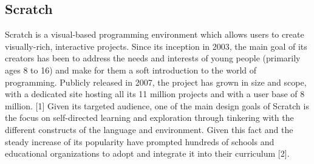 \subsection{Scratch}
Scratch is a visual-based programming environment which allows users to create visually-rich, interactive projects.  Since its inception in 2003, the main goal of its creators has been to address the needs and interests of young people (primarily ages 8 to 16) and make for them a soft introduction to the world of programming. Publicly released in 2007, the project has grown in size and scope, with a dedicated site hosting all its 11 million projects and with a user base of 8 million. [1]
Given its targeted audience, one of the main design goals of Scratch is the focus on self-directed learning and exploration through tinkering with the different constructs of the language and environment. Given this fact and the steady increase of its popularity have prompted hundreds of schools and educational organizations to adopt and integrate it into their curriculum [2].



